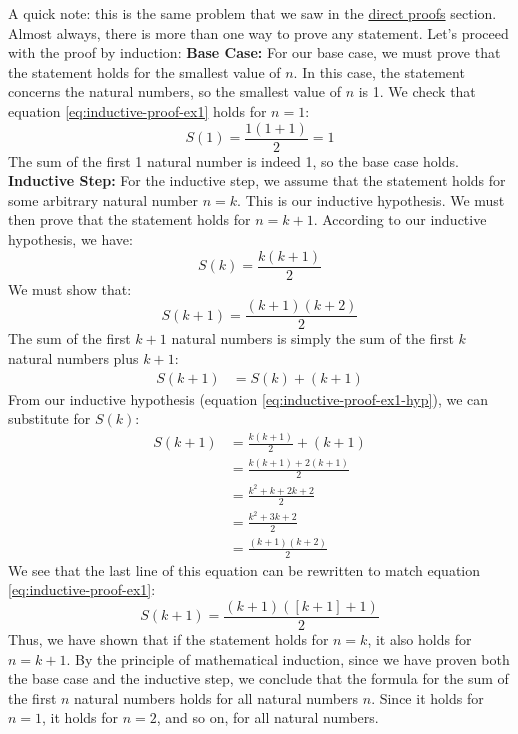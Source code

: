 \begin{answer}
    A quick note: this is the same problem that we saw in the \hyperref[sec:proofs]{direct proofs} section. Almost always, there is more than 
    one way to prove any statement. Let's proceed with the proof by induction:
    \newline\newline
    \textbf{Base Case:} For our base case, we must prove that the statement holds for the smallest 
    value of $n$. In this case, the statement concerns the natural numbers, so the smallest value of $n$ is 1. 
    We check that equation \ref{eq:inductive-proof-ex1} holds for $n=1$:
    \begin{equation*}
        S(1) = \frac{1(1+1)}{2} = 1
    \end{equation*}
    The sum of the first 1 natural number is indeed 1, so the base case holds.
    \newline\newline
    \textbf{Inductive Step:} For the inductive step, we assume that the statement holds for some arbitrary natural number $n=k$. 
    This is our inductive hypothesis. We must then prove that the statement holds for $n=k+1$. 
    According to our inductive hypothesis, we have:
    \begin{equation}\label{eq:inductive-proof-ex1-hyp}
        S(k) = \frac{k(k+1)}{2}
    \end{equation}
    We must show that:
    \begin{equation*}
        S(k+1) = \frac{(k+1)(k+2)}{2}
    \end{equation*}
    The sum of the first $k+1$ natural numbers is simply the sum of the first $k$ natural numbers plus $k+1$:
    \begin{align*}
        S(k+1) &= S(k) + (k+1) 
    \end{align*}
    From our inductive hypothesis (equation \ref{eq:inductive-proof-ex1-hyp}), we can substitute for $S(k)$:
    \begin{align*}
                S(k+1) &= \frac{k(k+1)}{2} + (k+1) \\
                &= \frac{k(k+1) + 2(k+1)}{2}  \\
                &= \frac{k^2 + k + 2k + 2}{2} \\
                &= \frac{k^2 + 3k + 2}{2} \\
                &= \frac{(k+1)(k + 2)}{2}
    \end{align*}
    We see that the last line of this equation can be rewritten to match equation \ref{eq:inductive-proof-ex1}:
    \begin{equation*}
        S(k+1) = \frac{(k+1)\left([k + 1] + 1\right)}{2}
    \end{equation*}
    Thus, we have shown that if the statement holds for $n=k$, it also holds for $n=k+1$.
    \newline\newline
    By the principle of mathematical induction, since we have proven both the base case and the inductive step,
    we conclude that the formula for the sum of the first $n$ natural numbers holds for all natural numbers $n$.
    Since it holds for $n=1$, it holds for $n=2$, and so on, for all natural numbers.
\end{answer}